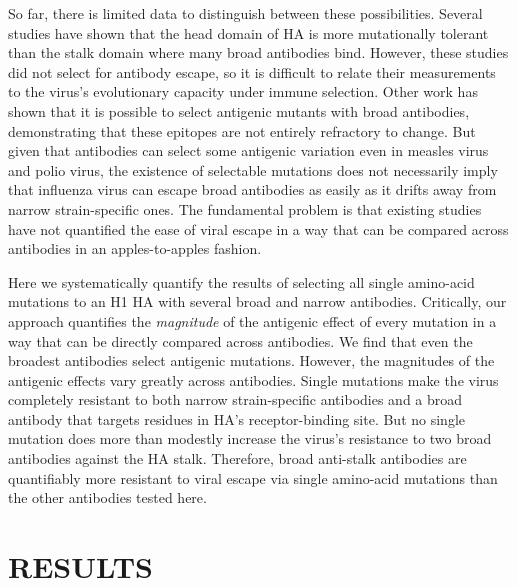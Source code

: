 \documentclass[11pt]{article}
\begin{document}
So far, there is limited data to distinguish between these possibilities.
Several studies have shown that the head domain of HA is more mutationally tolerant than the stalk domain where many broad antibodies bind\cite{thyagarajan2014inherent,wu2014high,heaton2013genome}.
However, these studies did not select for antibody escape, so it is difficult to relate their measurements to the virus's evolutionary capacity under immune selection.
Other work has shown that it is possible to select antigenic mutants with broad antibodies\cite{yoshida2009cross,chai2016two,ekiert2011highly,friesen2014common,dunand2015preexisting,anderson2017natural}, demonstrating that these epitopes are not entirely refractory to change.
But given that antibodies can select some antigenic variation even in measles virus\cite{birrer1981antigenic,ter1981antigenic} and polio virus\cite{crainic1983natural,diamond1985antigenic}, the existence of selectable mutations does not necessarily imply that influenza virus can escape broad antibodies as easily as it drifts away from narrow strain-specific ones.
The fundamental problem is that existing studies have not quantified the ease of viral escape in a way that can be compared across antibodies in an apples-to-apples fashion.

Here we systematically quantify the results of selecting all single amino-acid mutations to an H1 HA with several broad and narrow antibodies.
Critically, our approach quantifies the \emph{magnitude} of the antigenic effect of every mutation in a way that can be directly compared across antibodies.
We find that even the broadest antibodies select antigenic mutations.
However, the magnitudes of the antigenic effects vary greatly across antibodies.
Single mutations make the virus completely resistant to both narrow strain-specific antibodies and a broad antibody that targets residues in HA's receptor-binding site.
But no single mutation does more than modestly increase the virus's resistance to two broad antibodies against the HA stalk.
Therefore, broad anti-stalk antibodies are quantifiably more resistant to viral escape via single amino-acid mutations than the other antibodies tested here. 

\section*{RESULTS}
\label{sec:results}
\end{document}
